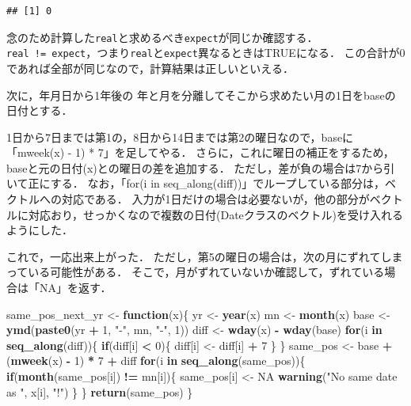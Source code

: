 \documentclass[
]{article}
\newenvironment{Shaded}{\begin{snugshade}}{\end{snugshade}}
\newcommand{\ConstantTok}[1]{\textcolor[rgb]{0.56,0.35,0.01}{#1}}
\newcommand{\ControlFlowTok}[1]{\textcolor[rgb]{0.13,0.29,0.53}{\textbf{#1}}}
\newcommand{\DecValTok}[1]{\textcolor[rgb]{0.00,0.00,0.81}{#1}}
\newcommand{\FunctionTok}[1]{\textcolor[rgb]{0.13,0.29,0.53}{\textbf{#1}}}
\newcommand{\NormalTok}[1]{#1}
\newcommand{\OtherTok}[1]{\textcolor[rgb]{0.56,0.35,0.01}{#1}}
\newcommand{\SpecialCharTok}[1]{\textcolor[rgb]{0.81,0.36,0.00}{\textbf{#1}}}
\newcommand{\StringTok}[1]{\textcolor[rgb]{0.31,0.60,0.02}{#1}}
\begin{document}
\begin{verbatim}
## [1] 0
\end{verbatim}

念のため計算した\texttt{real}と求めるべき\texttt{expect}が同じか確認する．
\texttt{real\ !=\ expect}，つまり\texttt{real}と\texttt{expect}異なるときはTRUEになる．
この合計が0であれば全部が同じなので，計算結果は正しいといえる．

次に，年月日から1年後の
年と月を分離してそこから求めたい月の1日をbaseの日付とする．

1日から7日までは第1の，8日から14日までは第2の曜日なので，baseに「mweek(x) - 1) * 7」を足してやる．
さらに，これに曜日の補正をするため，baseと元の日付(x)との曜日の差を追加する．
ただし，差が負の場合は7から引いて正にする．
なお，「for(i in seq\_along(diff))」でループしている部分は，ベクトルへの対応である．
入力が1日だけの場合は必要ないが，他の部分がベクトルに対応おり，せっかくなので複数の日付(Dateクラスのベクトル)を受け入れるようにした．

これで，一応出来上がった．
ただし，第5の曜日の場合は，次の月にずれてしまっている可能性がある．
そこで，月がずれていないか確認して，ずれている場合は「NA」を返す．

\begin{Shaded}
\begin{Highlighting}[]
\NormalTok{same\_pos\_next\_yr }\OtherTok{\textless{}{-}} \ControlFlowTok{function}\NormalTok{(x)\{}
\NormalTok{  yr }\OtherTok{\textless{}{-}} \FunctionTok{year}\NormalTok{(x)}
\NormalTok{  mn }\OtherTok{\textless{}{-}} \FunctionTok{month}\NormalTok{(x)}
\NormalTok{  base }\OtherTok{\textless{}{-}} \FunctionTok{ymd}\NormalTok{(}\FunctionTok{paste0}\NormalTok{(yr }\SpecialCharTok{+} \DecValTok{1}\NormalTok{, }\StringTok{"{-}"}\NormalTok{, mn, }\StringTok{"{-}"}\NormalTok{, }\DecValTok{1}\NormalTok{))}
\NormalTok{  diff }\OtherTok{\textless{}{-}} \FunctionTok{wday}\NormalTok{(x) }\SpecialCharTok{{-}} \FunctionTok{wday}\NormalTok{(base)}
  \ControlFlowTok{for}\NormalTok{(i }\ControlFlowTok{in} \FunctionTok{seq\_along}\NormalTok{(diff))\{}
    \ControlFlowTok{if}\NormalTok{(diff[i] }\SpecialCharTok{\textless{}} \DecValTok{0}\NormalTok{)\{ diff[i] }\OtherTok{\textless{}{-}}\NormalTok{ diff[i] }\SpecialCharTok{+} \DecValTok{7}\NormalTok{ \}}
\NormalTok{  \}}
\NormalTok{  same\_pos }\OtherTok{\textless{}{-}}\NormalTok{ base }\SpecialCharTok{+}\NormalTok{ (}\FunctionTok{mweek}\NormalTok{(x) }\SpecialCharTok{{-}} \DecValTok{1}\NormalTok{) }\SpecialCharTok{*} \DecValTok{7} \SpecialCharTok{+}\NormalTok{ diff}
  \ControlFlowTok{for}\NormalTok{(i }\ControlFlowTok{in} \FunctionTok{seq\_along}\NormalTok{(same\_pos))\{}
    \ControlFlowTok{if}\NormalTok{(}\FunctionTok{month}\NormalTok{(same\_pos[i]) }\SpecialCharTok{!=}\NormalTok{ mn[i])\{}
\NormalTok{      same\_pos[i] }\OtherTok{\textless{}{-}} \ConstantTok{NA}
      \FunctionTok{warning}\NormalTok{(}\StringTok{"No same date as "}\NormalTok{, x[i], }\StringTok{"!"}\NormalTok{)}
\NormalTok{    \}}
\NormalTok{  \}}
  \FunctionTok{return}\NormalTok{(same\_pos)}
\NormalTok{\}}
\end{Highlighting}
\end{Shaded}
\end{document}
